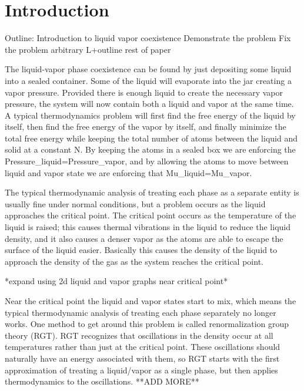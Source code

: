 \section{Introduction}

Outline:
Introduction to liquid vapor coexistence
Demonstrate the problem
Fix the problem
arbitrary L+outline rest of paper

The liquid-vapor phase coexistence can be found by just depositing some liquid into a sealed container. Some of the liquid will evaporate into the jar creating a vapor pressure. Provided there is enough liquid to create the necessary vapor pressure, the system will now contain both a liquid and vapor at the same time. A typical thermodynamics problem will first find the free energy of the liquid by itself, then find the free energy of the vapor by itself, and finally minimize the total free energy while keeping the total number of atoms between the liquid and solid at a constant N. By keeping the atoms in a sealed box we are enforcing the Pressure_liquid=Pressure_vapor, and by allowing the atoms to move between liquid and vapor state we are enforcing that Mu_liquid=Mu_vapor.

The typical thermodynamic analysis of treating each phase as a separate entity is usually fine under normal conditions, but a problem occurs as the liquid approaches the critical point. The critical point occurs as the temperature of the liquid is raised; this causes thermal vibrations in the liquid to reduce the liquid density, and it also causes a denser vapor as the atoms are able to escape the surface of the liquid easier. Basically this causes the density of the liquid to approach the density of the gas as the system reaches the critical point.

*expand using 2d liquid and vapor graphs near critical point*

Near the critical point the liquid and vapor states start to mix, which means the typical thermodynamic analysis of treating each phase separately no longer works. One method to get around this problem is called renormalization group theory (RGT). RGT recognizes that oscillations in the density occur at all temperatures rather than just at the critical point. These oscillations should naturally have an energy associated with them, so RGT starts with the first approximation of treating a liquid/vapor as a single phase, but then applies thermodynamics to the oscillations. **ADD MORE**

